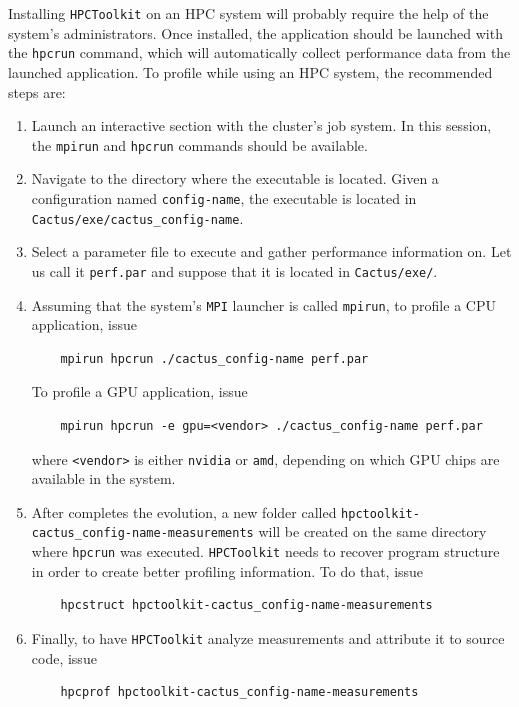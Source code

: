 Installing \texttt{HPCToolkit} on an HPC system will probably require the help of the system's administrators. Once installed, the application should be launched with the \texttt{hpcrun} command, which will automatically collect performance data from the launched application. To profile \CarpetX\space while using an HPC system, the recommended steps are:
%
\begin{enumerate}
  \item Launch an interactive section with the cluster's job system. In this session, the \texttt{mpirun} and \texttt{hpcrun} commands should be available.
  
  \item Navigate to the directory where the \Cactus\space executable is located. Given a configuration named \texttt{config-name}, the executable is located in \texttt{Cactus/exe/cactus\_config-name}.
  
  \item Select a parameter file to execute and gather performance information on. Let us call it \texttt{perf.par} and suppose that it is located in \texttt{Cactus/exe/}.
  
  \item Assuming that the system's \texttt{MPI} launcher is called \texttt{mpirun}, to profile a CPU application, issue
  \begin{verbatim}
    mpirun hpcrun ./cactus_config-name perf.par
  \end{verbatim}
  To profile a GPU application, issue
  \begin{verbatim}
    mpirun hpcrun -e gpu=<vendor> ./cactus_config-name perf.par
  \end{verbatim}
  where \texttt{<vendor>} is either \texttt{nvidia} or \texttt{amd}, depending on which GPU chips are available in the system.

  \item After \Cactus\space completes the evolution, a new folder called \texttt{hpctoolkit-cactus\_config-name-measurements} will be created on the same directory where \texttt{hpcrun} was executed. \texttt{HPCToolkit} needs to recover program structure in order to create better profiling information. To do that, issue
  \begin{verbatim}
    hpcstruct hpctoolkit-cactus_config-name-measurements
  \end{verbatim}

  \item Finally, to have \texttt{HPCToolkit} analyze measurements and attribute it to source code, issue
  \begin{verbatim}
    hpcprof hpctoolkit-cactus_config-name-measurements
  \end{verbatim}
\end{enumerate}

